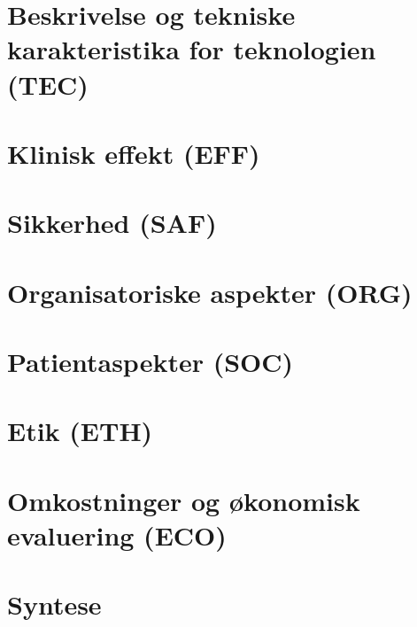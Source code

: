 \chapter{Beskrivelse og tekniske karakteristika for teknologien (TEC)}\vspace{-.75cm} \label{TEC_chap}


\chapter{Klinisk effekt (EFF)}\vspace{-.75cm} \label{EFF_chap}


\chapter{Sikkerhed (SAF)}\vspace{-.75cm} \label{SAF_chap}


\chapter{Organisatoriske aspekter (ORG)}\vspace{-.75cm} \label{ORG_chap}


\chapter{Patientaspekter (SOC)}\vspace{-.75cm} \label{SOC_chap}


\chapter{Etik (ETH)}\vspace{-.75cm} \label{ETH_chap}


\chapter{Omkostninger og økonomisk evaluering (ECO)}\vspace{-.75cm} \label{ECO_chap}


\chapter{Syntese}\vspace{-.75cm}\label{syntese_chap}



\cleardoublepage

\begingroup
\label{litteraturliste}
\raggedright


\endgroup

\begin{appendices}
	
	
\end{appendices}


